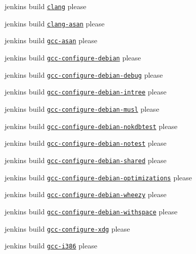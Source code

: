 \begin{DoxyItemize}
\item jenkins build \href{https://build.libelektra.org/job/elektra-clang/}{\tt clang} please
\item jenkins build \href{https://build.libelektra.org/job/elektra-clang-asan/}{\tt clang-\/asan} please
\item jenkins build \href{https://build.libelektra.org/job/elektra-gcc-asan/}{\tt gcc-\/asan} please
\item jenkins build \href{https://build.libelektra.org/job/elektra-gcc-configure-debian/}{\tt gcc-\/configure-\/debian} please
\item jenkins build \href{https://build.libelektra.org/job/elektra-gcc-configure-debian-debug}{\tt gcc-\/configure-\/debian-\/debug} please
\item jenkins build \href{https://build.libelektra.org/job/elektra-gcc-configure-debian-intree/}{\tt gcc-\/configure-\/debian-\/intree} please
\item jenkins build \href{https://build.libelektra.org/job/elektra-gcc-configure-debian-musl/}{\tt gcc-\/configure-\/debian-\/musl} please
\item jenkins build \href{https://build.libelektra.org/job/elektra-gcc-configure-debian-nokdbtest/}{\tt gcc-\/configure-\/debian-\/nokdbtest} please
\item jenkins build \href{https://build.libelektra.org/job/elektra-gcc-configure-debian-notest/}{\tt gcc-\/configure-\/debian-\/notest} please
\item jenkins build \href{https://build.libelektra.org/job/elektra-gcc-configure-debian-shared/}{\tt gcc-\/configure-\/debian-\/shared} please
\item jenkins build \href{https://build.libelektra.org/job/elektra-gcc-configure-debian-optimizations/}{\tt gcc-\/configure-\/debian-\/optimizations} please
\item jenkins build \href{https://build.libelektra.org/job/elektra-gcc-configure-debian-wheezy/}{\tt gcc-\/configure-\/debian-\/wheezy} please
\item jenkins build \href{https://build.libelektra.org/job/elektra-gcc-configure-debian-withspace/}{\tt gcc-\/configure-\/debian-\/withspace} please
\item jenkins build \href{https://build.libelektra.org/job/elektra-gcc-configure-xdg/}{\tt gcc-\/configure-\/xdg} please
\item jenkins build \href{https://build.libelektra.org/job/elektra-gcc-i386/}{\tt gcc-\/i386} please

\end{DoxyItemize}
